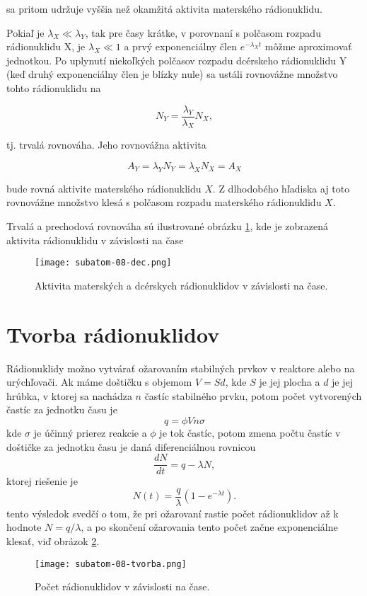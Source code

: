 \documentclass[../../main.tex]{subfiles}
\begin{document}
\begin{itemize}
sa pritom udržuje vyššia než okamžitá aktivita materského rádionuklidu.

Pokiaľ je $\lambda_X\ll\lambda_Y$, tak pre časy krátke, v porovnaní s polčasom rozpadu rádionuklidu X, je $\lambda_X \ll 1$ a prvý exponenciálny člen $e^{-\lambda_Xt}$ môžme aproximovať jednotkou. Po uplynutí niekoľkých polčasov rozpadu dcérskeho rádionuklidu Y (keď druhý exponenciálny člen je blízky nule) sa ustáli rovnovážne množstvo tohto rádionuklidu na 

$$ N_Y = \frac{\lambda_Y}{\lambda_X}N_X, $$ 

tj. trvalá rovnováha. Jeho rovnovážna aktivita 

$$ A_Y = \lambda_YN_Y = \lambda_XN_X = A_X $$

bude rovná aktivite materského rádionuklidu $X$. Z dlhodobého hľadiska aj toto rovnovážne množstvo klesá s polčasom rozpadu materského rádionuklidu $X$.
\end{itemize}

Trvalá a prechodová rovnováha sú ilustrované obrázku \ref{sf8:fig:dec}, kde je zobrazená aktivita rádionuklidu v závislosti na čase 

\begin{figure}[!h]
\texttt{[image: subatom-08-dec.png]}
\centering
\caption{Aktivita materských a dcérskych rádionuklidov v závislosti na čase.}
\label{sf8:fig:dec}
\end{figure}

\section{Tvorba rádionuklidov}
Rádionuklidy možno vytvárať ožarovaním stabilných prvkov v reaktore alebo na urýchľovači. Ak máme doštičku s objemom $V=Sd$, kde $S$ je jej plocha a $d$ je jej hrúbka, v ktorej sa nachádza $n$ častíc stabilného prvku, potom počet vytvorených častíc za jednotku času je 
$$ q = \phi Vn \sigma $$
kde $\sigma$ je účinný prierez reakcie a $\phi$ je tok častíc, potom zmena počtu častíc v doštičke za jednotku času je daná diferenciálnou rovnicou
$$ \frac{dN}{dt} = q - \lambda N, $$
ktorej riešenie je 
$$ N(t) = \frac{q}{\lambda} (1-e^{-\lambda t}).$$
tento výsledok svedčí o tom, že pri ožarovaní rastie počet rádionuklidov až k hodnote $N=q / \lambda$, a po skončení ožarovania tento počet začne exponenciálne klesať, viď obrázok \ref{sf8:fig:tvorba}.

\begin{figure}[!h]
\texttt{[image: subatom-08-tvorba.png]}
\centering
\caption{Počet rádionuklidov v závislosti na čase.}
\label{sf8:fig:tvorba}
\end{figure}
\end{document}
